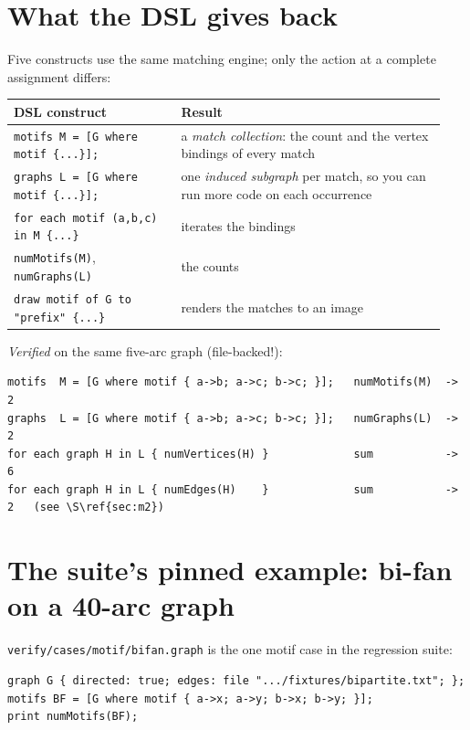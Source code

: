 \documentclass[11pt,a4paper]{article}
\newcommand{\code}[1]{\texttt{#1}}
\newcommand{\file}[1]{\texttt{#1}}
\begin{document}
\section{What the DSL gives back}
\label{sec:surface}

Five constructs use the same matching engine; only the action at a complete
assignment differs:

\begin{center}
\begin{tabular}{@{}p{0.36\linewidth}p{0.58\linewidth}@{}}
\toprule
DSL construct & Result \\
\midrule
\code{motifs M = [G where motif \{...\}];} & a \emph{match collection}: the
count and the vertex bindings of every match \\
\code{graphs L = [G where motif \{...\}];} & one \emph{induced subgraph} per
match, so you can run more code on each occurrence \\
\code{for each motif (a,b,c) in M \{...\}} & iterates the bindings \\
\code{numMotifs(M)}, \code{numGraphs(L)} & the counts \\
\code{draw motif of G to "prefix" \{...\}} & renders the matches to an image \\
\bottomrule
\end{tabular}
\end{center}

\noindent\emph{Verified} on the same five-arc graph (file-backed!):

\begin{lstlisting}[style=plain]
motifs  M = [G where motif { a->b; a->c; b->c; }];   numMotifs(M)  ->  2
graphs  L = [G where motif { a->b; a->c; b->c; }];   numGraphs(L)  ->  2
for each graph H in L { numVertices(H) }             sum           ->  6
for each graph H in L { numEdges(H)    }             sum           ->  2   (see \S\ref{sec:m2})
\end{lstlisting}

\section{The suite's pinned example: bi-fan on a 40-arc graph}

\file{verify/cases/motif/bifan.graph} is the one motif case in the regression
suite:

\begin{lstlisting}[style=plain]
graph G { directed: true; edges: file ".../fixtures/bipartite.txt"; };
motifs BF = [G where motif { a->x; a->y; b->x; b->y; }];
print numMotifs(BF);
\end{lstlisting}
\end{document}
